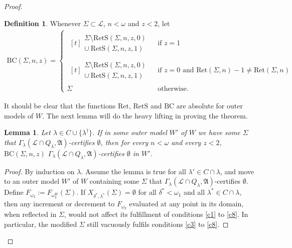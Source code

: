 \documentclass[12pt, twoside]{memoir}
\numberwithin{equation}{section}
\newtheorem{lem}[thm]{Lemma}
\theoremstyle{definition}
\newtheorem{defi}[thm]{Definition}
\theoremstyle{remark}
\theoremstyle{definition}
\theoremstyle{definition}
\theoremstyle{definition}
\theoremstyle{remark}
\begin{document}
\begin{proof}
\begin{defi}
Whenever $\Sigma \subset \mathcal{L}$, $n < \omega$ and $z < 2$, let
\begin{align*}
    \mathrm{BC}(\Sigma, n, z) = 
    \begin{cases}
    \!\begin{aligned}[t]
    \begin{split}
        \Sigma \setminus \mathrm{RetS}(\Sigma, n, z, 0) \\
        \cup \ \mathrm{RetS}(\Sigma, n, z, 1)
    \end{split}
    \end{aligned} & \text{if } z = 1 \\
    \!\begin{aligned}[t]
    \begin{split}
        \Sigma \setminus \mathrm{RetS}(\Sigma, n, z, 0) \\
        \cup \ \mathrm{RetS}(\Sigma, n, z, 1)
    \end{split}
    \end{aligned} & \text{if } z = 0 \text{ and } \mathrm{Ret}(\Sigma, n) - 1 \neq \mathrm{Ret}(\Sigma, n) \\
    \Sigma & \text{otherwise.}
    \end{cases}
\end{align*}
\end{defi}

It should be clear that the functions $\mathrm{Ret}$, $\mathrm{RetS}$ and $\mathrm{BC}$ are absolute for outer models of $W$. The next lemma will do the heavy lifting in proving the theorem.

\begin{lem}\label{lem7411}
Let $\lambda \in C \cup \{\lambda^{\dagger}\}$. If in some outer model $W'$ of $W$ we have some $\Sigma$ that $\Gamma_{\lambda} (\mathcal{L} \cap Q_{\lambda}, \mathfrak{A})$-certifies $\emptyset$, then for every $n < \omega$ and every $z < 2$, $\mathrm{BC}(\Sigma, n, z)$ $\Gamma_{\lambda} (\mathcal{L} \cap Q_{\lambda}, \mathfrak{A})$-certifies $\emptyset$ in $W'$.
\end{lem}

\begin{proof}
By induction on $\lambda$. Assume the lemma is true for all $\lambda' \in C \cap \lambda$, and move to an outer model $W'$ of $W$ containing some $\Sigma$ that $\Gamma_{\lambda} (\mathcal{L} \cap Q_{\lambda}, \mathfrak{A})$-certifies $\emptyset$. Define $F_{\omega_2} := F_{\omega_2^W}(\Sigma)$. If $X_{\delta^*, \lambda^*}(\Sigma) = \emptyset$ for all $\delta^* < \omega_1$ and all $\lambda^* \in C \cap \lambda$, then any increment or decrement to $F_{\omega_2}$ evaluated at any point in its domain, when reflected in $\Sigma$, would not affect its fulfillment of conditions \ref{c1} to \ref{c8}. In particular, the modified $\Sigma$ still vacuously fulfils conditions \ref{c3} to \ref{c8}.


\end{proof}
\end{proof}
\end{document}
